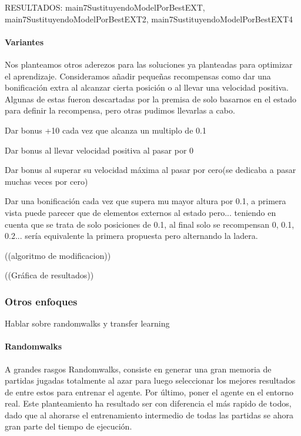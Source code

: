RESULTADOS: 	main7SustituyendoModelPorBestEXT, main7SustituyendoModelPorBestEXT2, main7SustituyendoModelPorBestEXT4

\paragraph{Variantes}
Nos planteamos otros aderezos para las soluciones ya planteadas para optimizar el aprendizaje. 
Consideramos añadir pequeñas recompensas como dar una bonificación extra al alcanzar cierta posición o al llevar una velocidad positiva.
Algunas de estas fueron descartadas por la premisa de solo basarnos en el estado para definir la recompensa, pero otras pudimos llevarlas a cabo.

 Dar bonus +10 cada vez que alcanza un multiplo de 0.1

 Dar bonus al llevar velocidad positiva al pasar por 0

 Dar bonus al superar su velocidad máxima al pasar por cero(se dedicaba a pasar muchas veces por cero)

 Dar una bonificación cada vez que supera mu mayor altura por 0.1, a primera vista puede parecer que de elementos externos al estado pero... teniendo en cuenta que se trata de solo posiciones de 0.1, al final solo se recompensan 0, 0.1, 0.2... sería equivalente la primera propuesta pero alternando la ladera. 

((algoritmo de modificacion))

((Gráfica de resultados))

\subsubsection*{Otros enfoques}
Hablar sobre randomwalks y transfer learning

\paragraph{Randomwalks}
A grandes rasgos Randomwalks, consiste en generar una gran memoria de partidas jugadas totalmente al azar para luego seleccionar los mejores resultados de entre estos para entrenar el agente. Por último, poner el agente en el entorno real.
Este planteamiento ha resultado ser con diferencia el más rapido de todos, dado que al ahorarse el entrenamiento intermedio de todas las partidas se ahora gran parte del tiempo de ejecución.


